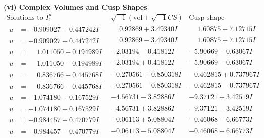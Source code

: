\documentclass[1p]{elsarticle_modified}
\theoremstyle{definition}
\newcommand{\I}{\sqrt{-1}}
\begin{document}
\newpage\flushleft \textbf{(vi) Complex Volumes and Cusp Shapes}
$$\begin{array}{c|c|c}  
\text{Solutions to }I^u_{1}& \I (\text{vol} + \sqrt{-1}CS) & \text{Cusp shape}\\
 \hline 
\begin{aligned}
u &= -0.909027 + 0.447242 I\end{aligned}
 & \phantom{-}0.92869 + 3.49340 I & \phantom{-}1.60875 - 7.12715 I \\ \hline\begin{aligned}
u &= -0.909027 - 0.447242 I\end{aligned}
 & \phantom{-}0.92869 - 3.49340 I & \phantom{-}1.60875 + 7.12715 I \\ \hline\begin{aligned}
u &= \phantom{-}1.011050 + 0.194989 I\end{aligned}
 & -2.03194 - 0.41812 I & -5.90669 + 0.63067 I \\ \hline\begin{aligned}
u &= \phantom{-}1.011050 - 0.194989 I\end{aligned}
 & -2.03194 + 0.41812 I & -5.90669 - 0.63067 I \\ \hline\begin{aligned}
u &= \phantom{-}0.836766 + 0.445768 I\end{aligned}
 & -0.270561 + 0.850318 I & -0.462815 + 0.737967 I \\ \hline\begin{aligned}
u &= \phantom{-}0.836766 - 0.445768 I\end{aligned}
 & -0.270561 - 0.850318 I & -0.462815 - 0.737967 I \\ \hline\begin{aligned}
u &= -1.074180 + 0.167529 I\end{aligned}
 & -4.56731 - 3.82886 I & -9.37121 + 3.42519 I \\ \hline\begin{aligned}
u &= -1.074180 - 0.167529 I\end{aligned}
 & -4.56731 + 3.82886 I & -9.37121 - 3.42519 I \\ \hline\begin{aligned}
u &= -0.984457 + 0.470779 I\end{aligned}
 & -0.06113 + 5.08804 I & -0.46068 - 6.66773 I \\ \hline\begin{aligned}
u &= -0.984457 - 0.470779 I\end{aligned}
 & -0.06113 - 5.08804 I & -0.46068 + 6.66773 I \\ \hline\begin{aligned}

\end{aligned}
\end{array}$$
\end{document}
